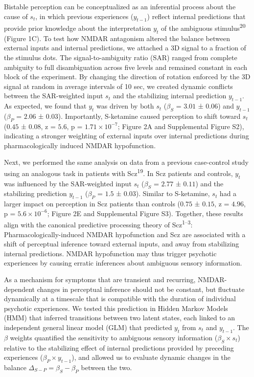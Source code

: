 \documentclass[
]{article}
\begin{document}
Bistable perception can be conceptualized as an inferential process
about the cause of \(s_t\), in which previous experiences (\(y_{t-1}\))
reflect internal predictions that provide prior knowledge about the
interpretation \(y_t\) of the ambiguous stimulus\textsuperscript{20}
(Figure 1C). To test how NMDAR antagonism altered the balance between
external inputs and internal predictions, we attached a 3D signal to a
fraction of the stimulus dots. The signal-to-ambiguity ratio (SAR)
ranged from complete ambiguity to full disambiguation across five levels
and remained constant in each block of the experiment. By changing the
direction of rotation enforced by the 3D signal at random in average
intervals of 10 sec, we created dynamic conflicts between the
SAR-weighted input \(s_t\) and the stabilizing internal prediction
\(y_{t-1}\). As expected, we found that \(y_t\) was driven by both
\(s_t\) (\(\beta_S\) = \(3.01\) ± \(0.06\)) and \(y_{t-1}\) (\(\beta_P\)
= \(2.06\) ± \(0.03\)). Importantly, S-ketamine caused perception to
shift toward \(s_t\) (\(0.45\) ± \(0.08\), z = \(5.6\), p =
\(\ensuremath{1.71\times 10^{-7}}\); Figure 2A and Supplemental Figure
S2), indicating a stronger weighting of external inputs over internal
predictions during pharmacologically induced NMDAR hypofunction.

Next, we performed the same analysis on data from a previous
case-control study using an analogous task in patients with
Scz\textsuperscript{19}. In Scz patients and controls, \(y_t\) was
influenced by the SAR-weighted input \(s_t\) (\(\beta_S\) = \(2.77\) ±
\(0.11\)) and the stabilizing prediction \(y_{t-1}\) (\(\beta_{P}\) =
\(1.5\) ± \(0.03\)). Similar to S-ketamine, \(s_t\) had a larger impact
on perception in Scz patients than controls (\(0.75\) ± \(0.15\), z =
\(4.96\), p = \(\ensuremath{5.6\times 10^{-6}}\); Figure 2E and
Supplemental Figure S3). Together, these results align with the
canonical predictive processing theory of Scz\textsuperscript{1--3}:
Pharmacologically-induced NMDAR hypofunction and Scz are associated with
a shift of perceptual inference toward external inputs, and away from
stabilizing internal predictions. NMDAR hypofunction may thus trigger
psychotic experiences by causing erratic inferences about ambiguous
sensory information.

As a mechanism for symptoms that are transient and recurring,
NMDAR-dependent changes in perceptual inference should not be constant,
but fluctuate dynamically at a timescale that is compatible with the
duration of individual psychotic experiences. We tested this prediction
in Hidden Markov Models (HMM) that inferred transitions between two
latent states, each linked to an independent general linear model (GLM)
that predicted \(y_t\) from \(s_t\) and \(y_{t-1}\). The \(\beta\)
weights quantified the sensitivity to ambiguous sensory information
(\(\beta_S \times s_t\)) relative to the stabilizing effect of internal
predictions provided by preceding experiences
(\(\beta_{P} \times y_{t-1}\)), and allowed us to evaluate dynamic
changes in the balance \(\Delta_{S-P} = \beta_S - \beta_P\) between the
two.
\end{document}
